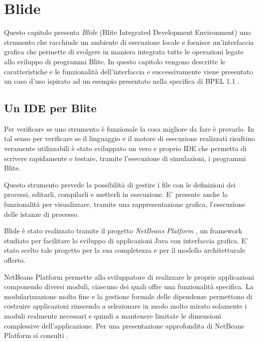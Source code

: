 \chapter{Blide}

Questo capitolo presenta \emph{Blide} (Blite Integrated Development
Environment) uno strumento che racchiude un ambiente di esecuzione locale e
fornisce un'interfaccia grafica che permette di svolgere in maniera integrata
tutte le operazioni legate allo sviluppo di programmi Blite. 
In questo capitolo vengono descritte le caratteristiche e le funzionalità
dell'interfaccia e successivamente viene presentato un caso d'uso ispirato ad
un esempio presentato nella specifica di BPEL 1.1 \cite{BPEL10Spec}.

\section{Un IDE per Blite}

Per verificare se uno strumento è funzionale la cosa migliore da fare
è provarlo. In tal senso per verificare se il linguaggio e il motore di
esecuzione realizzati risultino veramente utilizzabili è stato sviluppato un
vero e proprio IDE che permetta di scrivere rapidamente e testare, tramite
l'esecuzione di simulazioni, i programmi Blite.

Questo strumento prevede la possibilità di
gestire i file con le definizioni dei processi, editarli, compilarli e metterli
in esecuzione. E' presente anche la funzionalità per visualizzare, tramite una
rappresentazione grafica, l'esecuzione delle istanze di processo.

Blide è stato realizzato tramite il progetto \emph{NetBeans Platform}
\cite{NBPlatSite}, un framework studiato per facilitare lo sviluppo di
applicazioni Java con interfaccia grafica. E' stato scelto tale progetto per la sua
completezza e per il modello architetturale offerto. 

NetBeans Platform permette allo sviluppatore di realizzare le proprie
applicazioni componendo diversi moduli, ciascuno dei quali offre una
funzionalità specifica. La modularizzazione molto fine e la gestione
formale delle dipendenze permettono di costruire applicazioni riuscendo a
selezionare in modo molto mirato solamente i moduli realmente necessari e
quindi a mantenere limitate le dimensioni complessive dell'applicazione. 
Per una presentazione approfondita di NetBeans Platform si consulti
\cite{RichClientApp}.

